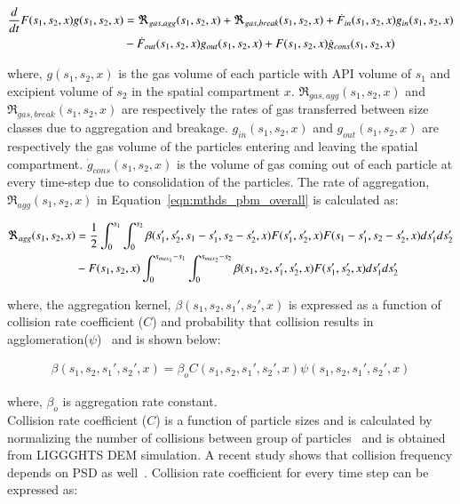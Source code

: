 \documentclass[preprint,11pt,authoryear]{elsarticle}
\begin{document}
\begin{align}
\frac{d}{dt}F(s_1,s_2,x)g(s_1,s_2,x)&= 
\Re_{gas,agg}(s_1,s_2,x)+\Re_{gas,break}(s_1,s_2,x)+\dot{F}_{in}(s_1,s_2,x)g_{in}(s_1,s_2,x)\notag\\
&-\dot{F}_{out}(s_1,s_2,x)g_{out}(s_1,s_2,x)+F(s_1,s_2,x)\dot{g}_{cons}(s_1,s_2,x)
\label{eqn:mthds_pbm_gas_agg} 
\end{align}

where, $g(s_1,s_2,x)$ is the gas volume of each particle with API volume of $s_1$ and excipient 
volume of $s_2$ in the spatial compartment $x$. $\Re_{gas,agg}(s_1,s_2,x)$ and 
$\Re_{gas,break}(s_1,s_2,x)$ are respectively the rates of gas transferred between size classes due to 
aggregation and breakage. $g_{in}(s_1,s_2,x)$ and $g_{out}(s_1,s_2,x)$ are respectively the gas 
volume of the particles entering and leaving the spatial compartment. $\dot{g}_{cons}(s_1,s_2,x)$ is the 
volume of gas coming out of each particle at every time-step due to consolidation of the particles. 
The rate of aggregation, $\Re_{agg}(s_1,s_2,x)$ in Equation~\ref{eqn:mthds_pbm_overall} is 
calculated as:~\citep{Chaturbedi2017}

\begin{align}
\Re_{agg}(s_1,s_2,x)&= \frac{1}{2}\int _0^{s_1} \int_0^{s_2} 
\beta(s_1',s_2',s_1-s_1',s_2-s_2',x)F(s_1',s_2',x)F(s_1-s_1',s_2-s_2',x)ds_1'ds_2'\notag\\ 
&- F(s_1,s_2,x)\int _0^{s_{max_1}-s_1} \int_0^{s_{max_2}-s_2} 
\beta(s_1,s_2,s_1',s_2',x)F(s_1',s_2',x)ds_1'ds_2'
\end{align}


where, the aggregation kernel, $\beta(s_1,s_2, s_1',s_2',x)$ is expressed as a function of collision 
rate coefficient ($C$) and probability that collision results in agglomeration($\psi$)~\citep{ingram2004}
and is shown below: 

\begin{align}
\beta(s_1,s_2,s_1',s_2',x) = \beta_oC(s_1,s_2,s_1',s_2',x)\psi(s_1,s_2,s_1',s_2',x)
\label{eqn:mthds_pbm_beta_kernal}
\end{align}

where, $\beta_o$ is aggregation rate constant.\\
Collision rate coefficient ($C$) is a function of particle sizes and is calculated by normalizing the 
number of collisions between group of particles~\citep{gantt2006} and is obtained from LIGGGHTS 
DEM simulation. A recent study shows that collision frequency depends on PSD as well~\citep{sen2014}. Collision rate coefficient for every time step can be expressed as:
\end{document}

